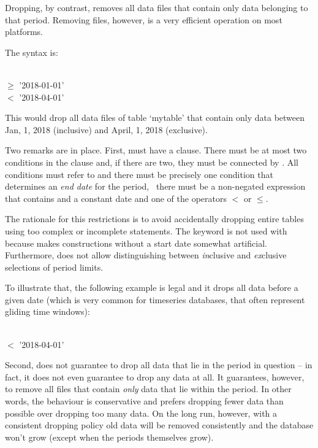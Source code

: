 Dropping, by contrast, removes all data files 
that contain only data belonging to that period.
Removing files, however, is a very efficient
operation on most platforms.

The syntax is:

  \\
 $\ge$ '2018-01-01' \\
\hspace*{0.45cm} $<$  '2018-04-01'

This would drop all data files of table `mytable'
that contain only data between Jan, 1, 2018 (inclusive) and
April, 1, 2018 (exclusive). 

Two remarks are in place. First,
 must have a  clause.
There must be at most two conditions in the  clause
and, if there are two, they must be connected by .
All conditions must refer to  and there
must be precisely one condition that
determines an \emph{end date}
for the period, \ie\ there must be a non-negated expression
that contains  and a constant date
and one of the operators $<$ or $\le$.

The rationale for this restrictions is
to avoid accidentally dropping entire tables
using too complex or incomplete  statements.
The keyword  is not used with 
because  makes constructions
without a start date somewhat artificial.
Furthermore,  does not allow
distinguishing between \emph{in}clusive and
\emph{ex}clusive selections of period limits.

To illustrate that, the following example 
is legal and it drops all data
before a given date (which is very common
for timeseries databases, that often represent gliding
time windows):

  \\
 $<$ '2018-04-01'

Second,  does not guarantee
to drop all data that lie in the period in question --
in fact, it does not even guarantee to drop any data at all.
It guarantees, however, to remove all files
that contain \emph{only} data that lie within the period.
In other words, the behaviour is conservative
and prefers dropping fewer data than possible over
dropping too many data.
On the long run, however, with a consistent dropping policy
old data will be removed consistently and the database
won't grow (except when the periods themselves grow).

